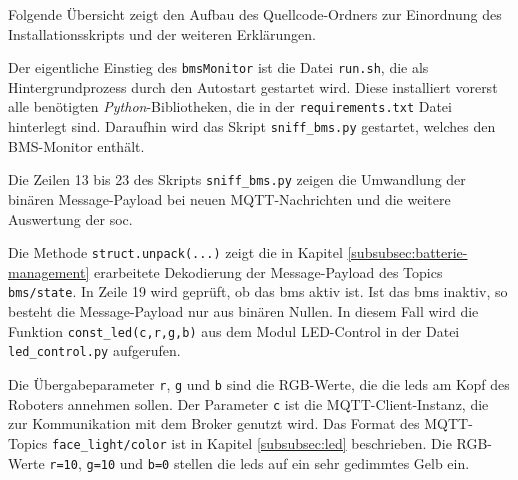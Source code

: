

\noindent Folgende Übersicht zeigt den Aufbau des Quellcode-Ordners zur Einordnung des Installationsskripts und der weiteren Erklärungen.

\vspace*{5pt}

Der eigentliche Einstieg des \texttt{bmsMonitor} ist die Datei \texttt{run.sh}, die als Hintergrundprozess durch den
Autostart gestartet wird.
Diese installiert vorerst alle benötigten \emph{Python}-Bibliotheken, die in der \texttt{requirements.txt} Datei hinterlegt
sind.
Daraufhin wird das Skript \texttt{sniff\_bms.py} gestartet, welches den BMS-Monitor enthält.



\noindent Die Zeilen \num{13} bis \num{23} des Skripts \texttt{sniff\_bms.py} zeigen die Umwandlung der binären Message-Payload
bei neuen MQTT-Nachrichten und die weitere Auswertung der \gls{soc}.



\noindent Die Methode \texttt{struct.unpack(...)} zeigt die in Kapitel \ref{subsubsec:batterie-management} erarbeitete
Dekodierung der Message-Payload des Topics \texttt{bms/state}.
In Zeile \num{19} wird geprüft, ob das \gls{bms} aktiv ist.
Ist das \gls{bms} inaktiv, so besteht die Message-Payload nur aus binären Nullen.
In diesem Fall wird die Funktion \texttt{const\_led(c,r,g,b)} aus dem Modul LED-Control in der Datei \texttt{led\_control.py}
aufgerufen.



\noindent Die Übergabeparameter \texttt{r}, \texttt{g} und \texttt{b} sind die RGB-Werte, die die \glspl{led} am Kopf des
Roboters annehmen sollen.
Der Parameter \texttt{c} ist die MQTT-Client-Instanz, die zur Kommunikation mit dem Broker genutzt wird.
Das Format des MQTT-Topics \texttt{face\_light/color} ist in Kapitel \ref{subsubsec:led} beschrieben.
Die RGB-Werte \texttt{r=10}, \texttt{g=10} und \texttt{b=0} stellen die \glspl{led} auf ein sehr gedimmtes Gelb ein.

